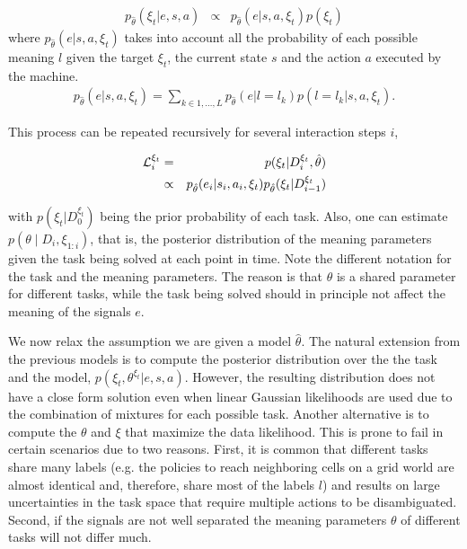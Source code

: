 \begin{eqnarray}
p_{\hat{\theta}}(\xi_t|e, s, a ) & \propto & p_{\hat{\theta}}(e |s, a, \xi_t) p(\xi_t)
\label{eq:1}
\end{eqnarray}
where  $p_{\hat{\theta}}(e |s, a, \xi_t)$ takes into account all the probability of each possible meaning $l$ given the target $\xi_t$, the current state $s$ and the action $a$ executed by the machine.
\begin{eqnarray}
p_{\hat{\theta}}(e |s, a,  \xi_t) =  \sum_{k \in {1, \ldots, L}} p_{\hat{\theta}}(e |l = l_k) p(l = l_k| s, a, \xi_t).
\end{eqnarray}

This process can be repeated recursively for several interaction steps $i$, 

\begin{eqnarray}
\mathcal{L}_i^{\xi_t} & = & p(\xi_t|D_i^{\xi_t}, \hat{\theta}) \nonumber \\
& \propto & p_{\hat{\theta}}(e_i |s_i, a_i, \xi_t) p_{ \hat{\theta}}(\xi_t|D_{i-1}^{\xi_t})
\label{eq:filter}
\end{eqnarray}

with $p(\xi_t|D_0^{\xi_t})$ being the prior probability of each task. Also, one can estimate $p(\theta \mid D_i, \xi_{1:i})$, that is, the posterior distribution of the meaning parameters given the task being solved at each point in time. Note the different notation for the task and the meaning parameters. The reason is that $\theta$ is a shared parameter for different tasks, while the task being solved should in principle not affect the meaning of the signals $e$.


We now relax the assumption we are given a model $\hat{\theta}$. The natural extension from the previous models is to compute the posterior distribution over the the task and the model, $p(\xi_t, \theta^{\xi_t} |e, s, a)$. However, the resulting distribution does not have a close form solution even when linear Gaussian likelihoods are used due to the combination of mixtures for each possible task. Another alternative is to compute the $\theta$ and $\xi$ that maximize the data likelihood. This is prone to fail in certain scenarios due to two reasons. First, it is common that different tasks share many labels (e.g. the policies to reach neighboring cells on a grid world are almost identical and, therefore, share most of the labels $l$) and results on large uncertainties in the task space that require multiple actions to be disambiguated. Second, if the signals are not well separated the meaning parameters $\theta$ of different tasks will not differ much.  


